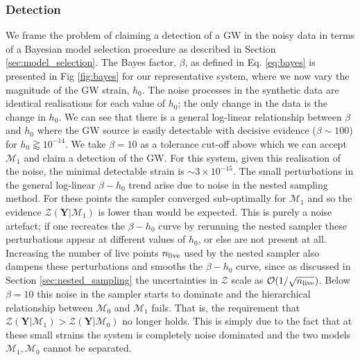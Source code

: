 \documentclass[fleqn,usenatbib,useAMS]{mnras}
\begin{document}
\subsubsection{Detection} \label{sec:detection}
We frame the problem of claiming a detection of a GW in the noisy data in terms of a Bayesian model selection procedure as described in Section \ref{sec:model_selection}. The Bayes factor, $\beta$, as defined in Eq. \ref{eq:bayes} is presented in Fig \ref{fig:bayes} for our representative system, where we now vary the magnitude of the GW strain, $h_0$. The noise processes in the synthetic data are identical realisations for each value of $h_0$; the only change in the data is the change in $h_0$. We can see that there is a general log-linear relationship between $\beta$ and $h_0$ where the GW source is easily detectable with decisive evidence ($\beta \sim 100$) for $h_0 \gtrapprox 10^{-14}$. We take $\beta = 10$ as a tolerance cut-off above which we can accept $\mathcal{M}_1$ and claim a detection of the GW. For this system, given this realisation of the noise, the minimal detectable strain is $\sim 3 \times 10^{-15}$. The small perturbations in the general log-linear $\beta - h_0$ trend arise due to noise in the nested sampling method. For these points the sampler converged sub-optimally for $\mathcal{M}_1$ and so the evidence $\mathcal{Z}(\boldsymbol{Y} | \mathcal{M}_1)$ is lower than would be expected. This is purely a noise artefact; if one recreates the $\beta - h_0$ curve by rerunning the nested sampler these perturbations appear at different values of $h_0$, or else are not present at all. Increasing the number of live points $n_{\rm live}$ used by the nested sampler also dampens these perturbations and smooths the $\beta - h_0$ curve, since as discussed in Section \ref{sec:nested_sampling} the uncertainties in $\mathcal{Z}$ scale as $\mathcal{O}(1/ \sqrt{n_{\rm live}})$. Below $\beta = 10$ this noise in the sampler starts to dominate and the hierarchical relationship between $\mathcal{M}_0$ and  $\mathcal{M}_1$ fails. That is, the requirement that $\mathcal{Z}(\boldsymbol{Y} | \mathcal{M}_1) > \mathcal{Z}(\boldsymbol{Y} | \mathcal{M}_0)$ no longer holds. This is simply due to the fact that at these small strains the system is completely noise dominated and the two models $\mathcal{M}_1, \mathcal{M}_0$ cannot be separated.  
\end{document}
